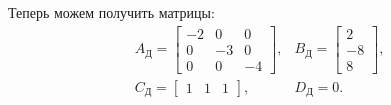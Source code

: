 \begin{enumerate}
    Теперь можем получить матрицы:
    \begin{equation*}
        \begin{array}{cc}
            A_\text{Д}=\begin{bmatrix}
                -2 & 0 & 0 \\
                0 & -3 & 0 \\
                0 & 0 & -4
            \end{bmatrix}, &
            B_\text{Д}=\begin{bmatrix}
                2 \\ -8 \\ 8
            \end{bmatrix}, \\[7mm]
            C_\text{Д}=\begin{bmatrix}
                1 & 1 & 1
            \end{bmatrix}, &
            D_\text{Д}=0.
        \end{array}
    \end{equation*}
\end{enumerate}